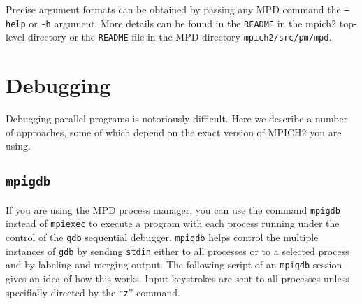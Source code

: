 \documentclass[dvipdfm,11pt]{article}
\begin{document}
Precise argument formats can be obtained by passing any MPD command the
\texttt{--help} or \texttt{-h} argument.  More details can be found in
the \texttt{README} in the mpich2 top-level directory or the
\texttt{README} file in the MPD directory \texttt{mpich2/src/pm/mpd}.


\section{Debugging}
\label{sec:debugging}

Debugging parallel programs is notoriously difficult.  Here we describe
a number of approaches, some of which depend on the exact version of
MPICH2 you are using. 


\subsection{\texttt{mpigdb}}
\label{sec:mpigdb}

If you are using the MPD process manager, you can use the command
\texttt{mpigdb} instead of \texttt{mpiexec} to execute a program with
each process running under the control of the \texttt{gdb} sequential
debugger.  \texttt{mpigdb} helps control the multiple instances of
\texttt{gdb} by sending \texttt{stdin} either to all processes or to a
selected process and by labeling and merging output.  The following
script of an \texttt{mpigdb} session gives an idea of how this works.
Input keystrokes are sent to all processes unless specifially directed
by the ``\texttt{z}'' command.
\end{document}
